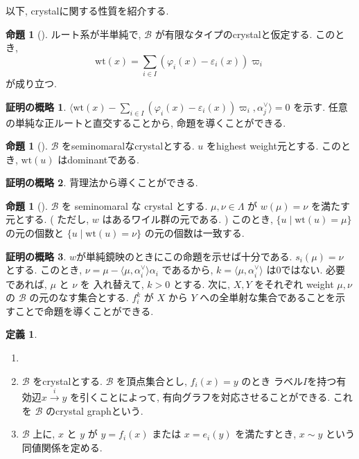 \documentclass[
  a4paper, 
  12pt,
  ja=standard,
  xelatex,
  left=30truemm,
  right=30truemm,
  titlepage 
]{bxjsarticle}
\theoremstyle{definition}
\newtheorem{df}{定義}
\newtheorem{prop}[thm]{命題}
\newtheorem*{prf}{証明の概略}
\begin{document}
以下, crystalに関する性質を紹介する.

\begin{prop}[{\cite[補題2.14]{b1}}] 
  ルート系が半単純で, $\mathscr{B}$ が有限なタイプのcrystalと仮定する. このとき,
  $$ \mathrm{wt}(x) = \sum_{ i \in I} (\varphi_i(x) - \varepsilon_i(x)) \varpi_i $$
  が成り立つ.
\end{prop}

\begin{prf}
  $ \langle \mathrm{wt}(x) - \sum_{ i \in I} (\varphi_i(x) - \varepsilon_i(x)) \varpi_i, \alpha^{ \vee }_j \rangle = 0 $
  を示す. 任意の単純な正ルートと直交することから, 命題を導くことができる. 
\end{prf}

\begin{prop}[{\cite[命題2.16]{b1}}] 
  $\mathscr{B}$ をseminomaralなcrystalとする. $u$ をhighest weight元とする. このとき, $\mathrm{wt}(u)$ はdominantである.
\end{prop}

\begin{prf}
  背理法から導くことができる.
\end{prf}

\begin{prop}[{\cite[命題2.17]{b1}}] 
  $ \mathscr{B} $ を seminomaral な crystal とする. $ \mu, \nu \in \Lambda $ が $ w(\mu) = \nu $ を満たす元とする. 
  ( ただし, $w$ はあるワイル群の元である. )
  このとき,  
  $ \{ u \mid \mathrm{wt}(u) = \mu \} $ の元の個数と $ \{ u \mid \mathrm{wt}(u) = \nu \} $ の元の個数は一致する.
\end{prop}

\begin{prf}
  $w$が単純鏡映のときにこの命題を示せば十分である. $ s_i(\mu) = \nu $ とする.
  このとき, $\nu = \mu - \langle \mu, \alpha^{ \vee }_i \rangle \alpha_i $ であるから, 
  $k =  \langle \mu, \alpha^{ \vee }_i \rangle$ は0ではない. 必要であれば, $\mu$ と $\nu$ を
  入れ替えて, $ k > 0 $ とする.
  次に, $X, Y$ をそれぞれ weight $\mu, \nu$ の $\mathscr{B}$ の元のなす集合とする.
  $f_i^{k}$ が $X$ から $Y$ への全単射な集合であることを示すことで命題を導くことができる.
\end{prf}

\begin{df}
  \begin{enumerate}
    \item []
    \item $\mathscr{B}$ をcrystalとする.  $\mathscr{B}$ を頂点集合とし,  $f_i(x) = y$ のとき
    ラベル$I$を持つ有効辺$ x \xrightarrow{i} y$ を引くことによって, 有向グラフを対応させることができる.
    これを $\mathscr{B}$ のcrystal graphという.
    \item $\mathscr{B}$ 上に, $x$ と $y$ が $y = f_i(x)$ または $x = e_i(y)$ を満たすとき, $x \sim y$ という同値関係を定める.
  \end{enumerate}
\end{df}
\end{document}
